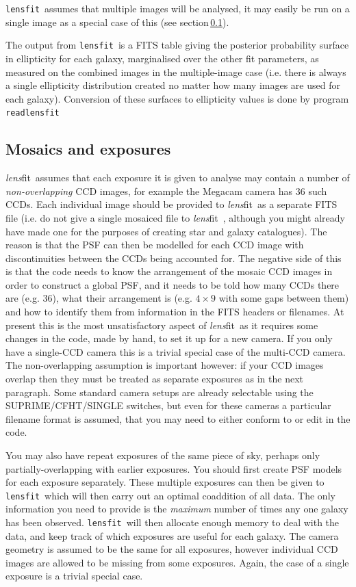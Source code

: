 \documentclass{article}
\def\lensfit{{\tt lensfit}\ }
\def\lensfitsuite{{\em lens}fit\ }
\def\readlensfit{{\tt readlensfit}\ }
\begin{document}
\lensfit assumes that multiple images will be analysed, it may easily be run on a single image as a special 
case of this (see section\,\ref{mosaics}).

The output from \lensfit is a FITS table giving the posterior probability surface in ellipticity for each galaxy, 
marginalised over the other fit parameters, as measured on the combined images in the multiple-image case 
(i.e. there is always a single ellipticity distribution created no matter how many images are used for each 
galaxy). Conversion of these surfaces to ellipticity values is done by program \readlensfit

\subsection{Mosaics and exposures}\label{mosaics}
\lensfitsuite assumes that each exposure it is given to analyse may contain a number of {\em non-overlapping}
CCD images, for example the Megacam camera has 36 such CCDs.  Each individual image should be 
provided to \lensfitsuite as a separate FITS file (i.e. do not give a single mosaiced file to \lensfitsuite,
although you might already have made one for the purposes of creating star and galaxy catalogues).
The reason is that the PSF can then be modelled for each CCD image with discontinuities between the CCDs
being accounted for.  The negative side of this is that the code needs to know the arrangement of
the mosaic CCD images in order to construct a global PSF, and it needs to be told how many CCDs there
are (e.g. 36), what their arrangement is (e.g. $4 \times 9$ with some gaps between them) and how to
identify them from information in the FITS headers or filenames.  At present
this is the most unsatisfactory aspect of \lensfitsuite as it requires some changes in the code, made by
hand, to set it up for a new camera.  If you only have a single-CCD camera this is a trivial special
case of the multi-CCD camera.  The non-overlapping assumption is important however: if your CCD images
overlap then they must be treated as separate exposures as in the next paragraph.  Some standard camera setups
are already selectable using the SUPRIME/CFHT/SINGLE switches, but even for these cameras a particular
filename format is assumed, that you may need to either conform to or edit in the code.

You may also have repeat exposures of the same piece of sky, perhaps only partially-overlapping
with earlier exposures.  You should first create PSF models for each exposure separately.
These multiple exposures can then be given to \lensfit which will then carry out an optimal
coaddition of all data.  The only information you need to provide is the {\em maximum} number of times any
one galaxy has been observed.  \lensfit will then allocate enough memory to deal with the data,
and keep track of which exposures are useful for each galaxy.  
The camera geometry is assumed to be the same for all exposures, however individual CCD images are 
allowed to be missing from some exposures.  Again, the case of a single exposure
is a trivial special case.  
\end{document}
